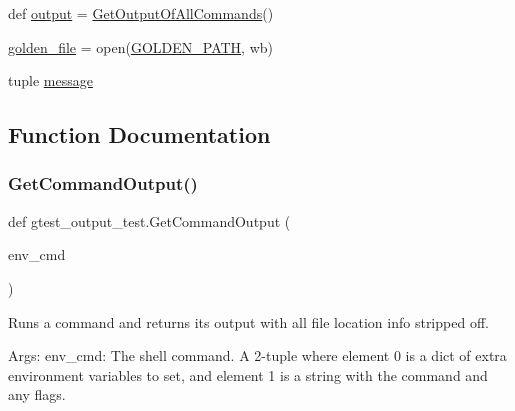 \begin{DoxyCompactItemize}
def \hyperlink{namespacegtest__output__test_ab2bb62f6e360282592cb10d76c25750c}{output} = \hyperlink{namespacegtest__output__test_a9d88a4a9a91b97a369abac2170a23ebe}{Get\+Output\+Of\+All\+Commands}()
\item 
\hyperlink{namespacegtest__output__test_a0a02ae5e249d93c376bbce6fb87f9405}{golden\+\_\+file} = open(\hyperlink{namespacegtest__output__test_aa592d897eeba0ac7e1a3c7d84f182c11}{G\+O\+L\+D\+E\+N\+\_\+\+P\+A\+TH}, \textquotesingle{}wb\textquotesingle{})
\item 
tuple \hyperlink{namespacegtest__output__test_ac696d0798ad7d08cb2e61070824750e2}{message}
\end{DoxyCompactItemize}


\subsection{Function Documentation}
\mbox{\label{namespacegtest__output__test_a953ec555d073485fbc7d9a092e8f1dea}} 
\subsubsection{\texorpdfstring{Get\+Command\+Output()}{GetCommandOutput()}}
{\footnotesize\ttfamily def gtest\+\_\+output\+\_\+test.\+Get\+Command\+Output (\begin{DoxyParamCaption}\item[{}]{env\+\_\+cmd }\end{DoxyParamCaption})}

\begin{DoxyVerb}Runs a command and returns its output with all file location
info stripped off.

Args:
  env_cmd:  The shell command. A 2-tuple where element 0 is a dict of extra
            environment variables to set, and element 1 is a string with
            the command and any flags.
\end{DoxyVerb}
 \mbox{\label{namespacegtest__output__test_a9d88a4a9a91b97a369abac2170a23ebe}} 

